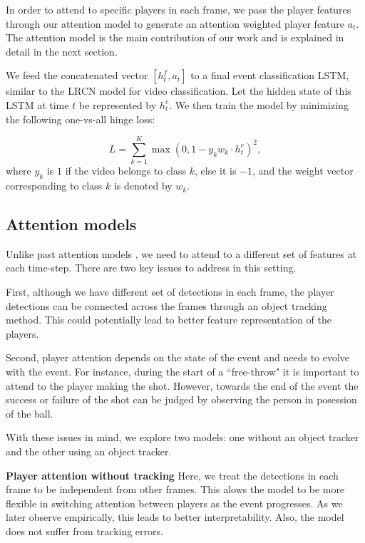 \documentclass[10pt,twocolumn,letterpaper]{article}
\begin{document}
In order to attend to specific players in each frame, we pass the player features
through our attention model to generate an attention weighted player feature
$a_t$. The attention model is the main contribution of our work
and is explained in detail in the next section.

We feed the concatenated vector $[h^f_t, a_t]$ to a final event classification
LSTM, similar to the LRCN \cite{} model for video classification. Let
the hidden state of this LSTM at time $t$ be represented by $h^e_t$.  We then
train the model by minimizing the following one-vs-all hinge loss:

\begin{equation}
  L = \sum_{k = 1}^K \max (0, 1 - y_k w_k \cdot h^e_t)^2,
\end{equation} where $y_k$ is $1$ if the video belongs to class $k$,
else it is $-1$, and the weight vector corresponding to
class $k$ is denoted by $w_k$.

\subsection{Attention models}

Unlike past attention models \cite{}, we need to attend to a different set of
features at each time-step. There are two key issues to address in this
setting.

First, although we have different set of detections in each frame, the player
detections can be connected across the frames through an object tracking
method. This could potentially lead to better feature representation of the
players.

Second, player attention depends on the state of the event and needs to evolve
with the event.  For instance, during the start of a ``free-throw" it is
important to attend to the player making the shot. However, towards the end of
the event the success or failure of the shot can be judged by observing the
person in posession of the ball.

With these issues in mind, we explore two models:
one without an object tracker and the other using an object tracker.

\noindent \textbf{Player attention without tracking}
Here, we treat the detections in each frame to be independent from other
frames.  This alows the model to be more flexible in switching attention
between players as the event progresses.  As we later observe empirically, this
leads to better interpretability.  Also, the model does not suffer from
tracking errors.
\end{document}
